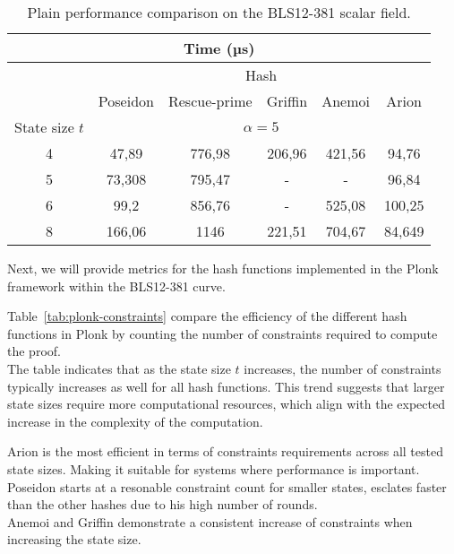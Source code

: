 \begin{table}[htbp]
  \centering
  \begin{tabular}{@{}cccccc@{}}
  \toprule
  \multicolumn{6}{c}{Time (µs)}                                \\ \midrule
  \multicolumn{1}{l|}{}               & \multicolumn{5}{c}{Hash}       \\ \cmidrule(l){2-6} 
  \multicolumn{1}{l|}{}  & \multicolumn{1}{l}{Poseidon}   & \multicolumn{1}{l}{Rescue-prime} & \multicolumn{1}{l}{Griffin}    & \multicolumn{1}{l}{Anemoi}     & Arion     \\ \midrule
  \multicolumn{1}{c|}{State size $t$} & \multicolumn{5}{c}{$\alpha=5$} \\ \midrule
  \multicolumn{1}{c|}{4} & \multicolumn{1}{c|}{47,89}  & \multicolumn{1}{c|}{776,98}   & \multicolumn{1}{c|}{206,96} & \multicolumn{1}{c|}{421,56} & 94,76  \\
  \multicolumn{1}{c|}{5} & \multicolumn{1}{c|}{73,308} & \multicolumn{1}{c|}{795,47}   & \multicolumn{1}{c|}{-}         & \multicolumn{1}{c|}{-}         & 96,84  \\
  \multicolumn{1}{c|}{6} & \multicolumn{1}{c|}{99,2}   & \multicolumn{1}{c|}{856,76}   & \multicolumn{1}{c|}{-}         & \multicolumn{1}{c|}{525,08} & 100,25 \\
  \multicolumn{1}{c|}{8} & \multicolumn{1}{c|}{166,06} & \multicolumn{1}{c|}{1146}    & \multicolumn{1}{c|}{221,51} & \multicolumn{1}{c|}{704,67} & 84,649 \\ \bottomrule
  \end{tabular}
  \caption{Plain performance comparison on the BLS12-381 scalar field.}
  \label{tab:bls-plain-performance}
  \end{table}

Next, we will provide metrics for the hash functions implemented in the Plonk framework within the BLS12-381 curve.

Table~\ref{tab:plonk-constraints} compare the efficiency of the different hash functions in Plonk by counting the number of constraints required to compute the proof.\\
The table indicates that as the state size $t$ increases, the number of constraints typically increases as well for all hash functions. This trend suggests that larger state sizes require more computational resources, which align with the expected increase in the complexity of the computation.

Arion is the most efficient in terms of constraints requirements across all tested state sizes. Making it suitable for systems where performance is important.\\
Poseidon starts at a resonable constraint count for smaller states, esclates faster than the other hashes due to his high number of rounds.\\
Anemoi and Griffin demonstrate a consistent increase of constraints when increasing the state size.


